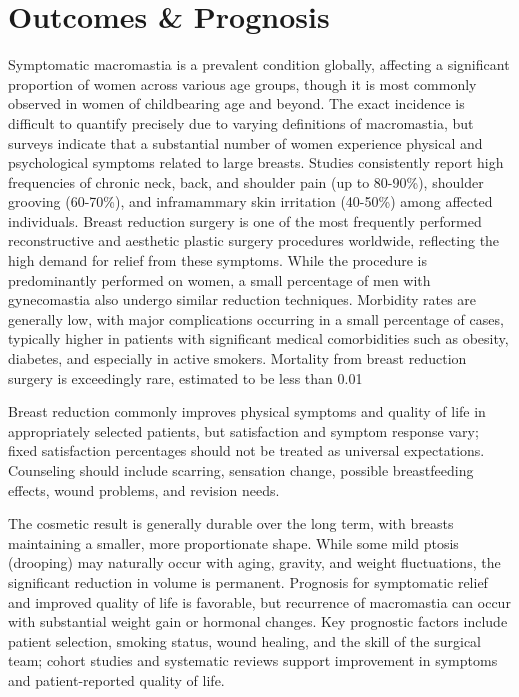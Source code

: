 \section*{Outcomes \& Prognosis}
Symptomatic macromastia is a prevalent condition globally, affecting a significant proportion of women across various age groups, though it is most commonly observed in women of childbearing age and beyond. The exact incidence is difficult to quantify precisely due to varying definitions of macromastia, but surveys indicate that a substantial number of women experience physical and psychological symptoms related to large breasts. Studies consistently report high frequencies of chronic neck, back, and shoulder pain (up to 80-90\%), shoulder grooving (60-70\%), and inframammary skin irritation (40-50\%) among affected individuals. Breast reduction surgery is one of the most frequently performed reconstructive and aesthetic plastic surgery procedures worldwide, reflecting the high demand for relief from these symptoms. While the procedure is predominantly performed on women, a small percentage of men with gynecomastia also undergo similar reduction techniques. Morbidity rates are generally low, with major complications occurring in a small percentage of cases, typically higher in patients with significant medical comorbidities such as obesity, diabetes, and especially in active smokers. Mortality from breast reduction surgery is exceedingly rare, estimated to be less than 0.01%

Breast reduction commonly improves physical symptoms and quality of life in appropriately selected patients, but satisfaction and symptom response vary; fixed satisfaction percentages should not be treated as universal expectations. Counseling should include scarring, sensation change, possible breastfeeding effects, wound problems, and revision needs.

The cosmetic result is generally durable over the long term, with breasts maintaining a smaller, more proportionate shape. While some mild ptosis (drooping) may naturally occur with aging, gravity, and weight fluctuations, the significant reduction in volume is permanent. Prognosis for symptomatic relief and improved quality of life is favorable, but recurrence of macromastia can occur with substantial weight gain or hormonal changes. Key prognostic factors include patient selection, smoking status, wound healing, and the skill of the surgical team; cohort studies and systematic reviews support improvement in symptoms and patient-reported quality of life.


